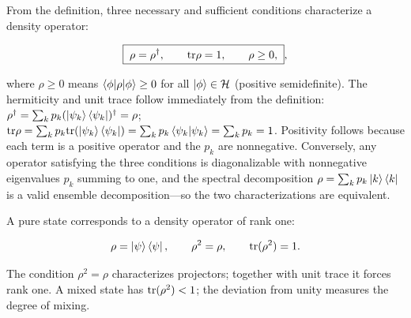 From the definition, three necessary and sufficient conditions characterize a density operator:
\begin{linenomath}
\begin{equation}
\boxed{\;
\rho = \rho^\dagger,\qquad \mathrm{tr}\rho = 1,\qquad \rho \ge 0,
\;},
\label{eq:density-properties}
\end{equation}
\end{linenomath}
where $\rho \ge 0$ means $\braket{\phi|\rho|\phi} \ge 0$ for all $\ket{\phi} \in \mathcal{H}$ (positive semidefinite). The hermiticity and unit trace follow immediately from the definition: $\rho^\dagger = \sum_k p_k (\ket{\psi_k}\bra{\psi_k})^\dagger = \rho$; $\mathrm{tr}\rho = \sum_k p_k \mathrm{tr}(\ket{\psi_k}\bra{\psi_k}) = \sum_k p_k \braket{\psi_k|\psi_k} = \sum_k p_k = 1$. Positivity follows because each term is a positive operator and the $p_k$ are nonnegative. Conversely, any operator satisfying the three conditions is diagonalizable with nonnegative eigenvalues $p_k$ summing to one, and the spectral decomposition $\rho = \sum_k p_k \ket{k}\bra{k}$ is a valid ensemble decomposition---so the two characterizations are equivalent.

A pure state corresponds to a density operator of rank one:
\begin{linenomath}
\begin{equation}
\rho = \ket{\psi}\bra{\psi},
\qquad \rho^2 = \rho,\qquad \mathrm{tr}(\rho^2) = 1.
\end{equation}
\end{linenomath}
The condition $\rho^2 = \rho$ characterizes projectors; together with unit trace it forces rank one. A mixed state has $\mathrm{tr}(\rho^2) < 1$; the deviation from unity measures the degree of mixing.

